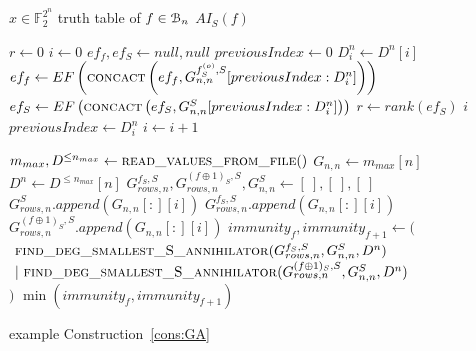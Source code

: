 \documentclass[11pt]{llncs}
\begin{document}
\begin{algorithm}
	\caption{Algorithm to find the algebraic immunity of a function $f$ on the restricted set $S\subseteq \mathbb{F}_2^n$}
	\begin{algorithmic}[1]
		\Require $x\in \mathbb{F}_2^{2^n}$ truth table of $f\in \mathcal{B}_{n}$
		\Ensure $AI_S(f)$
		
		\State $r \gets 0$
		\State $i \gets 0$
		\State $ef_f, ef_S \gets null, null$
		\State $previousIndex \gets 0$
		\State $D_i^n \gets D^n[i]$
		\State $ef_f\gets EF\left(\mbox{\textsc{concact}}\left(ef_f, G_{n,n}^{f_S^{(o)},S}[previousIndex:D_i^n]\right)\right)$
		\State $ef_S \gets EF\left(\mbox{\textsc{concact}}\left(ef_S, G_{n,n}^S[previousIndex:D_i^n]\right)\right)$
		\State $r \gets rank\left(ef_S\right)$
		\State
		\Return $i$
		\EndIf
		\State $previousIndex \gets D_i^n$
		\State $i \gets i+1$
		\EndWhile
		\EndFunction
		\State
		
		\State $m_{max}, D^{\leq n_{max}}\gets \mbox{\textsc{read\_values\_from\_file}}()$
		\State $G_{n,n}\gets m_{max}[n]$
		\State $D^n \gets D^{\leq n_{max}}[n]$
		\State $G_{rows,n}^{f_S,S}, G_{rows,n}^{(f\oplus 1)_S,S}, G_{n,n}^S \gets [\ ], [\ ], [\ ]$
		\State $G_{rows,n}^{S}.append\left(G_{n,n}[:][i]\right)$
		\State $G_{rows,n}^{f_S,S}.append\left(G_{n,n}[:][i]\right)$
		\Else
		\State $G_{rows,n}^{(f\oplus 1)_S,S}.append\left(G_{n,n}[:][i]\right)$
		\EndIf
		\EndIf
		\EndFor
		\State $immunity_f, immunity_{f+1} \leftarrow ($\\
		$\ \mbox{\textsc{find\_deg\_smallest\_S\_annihilator}}(G_{rows,n}^{f_S,S}, G_{n,n}^S,D^{n})$\\
		$\ |\ \mbox{\textsc{find\_deg\_smallest\_S\_annihilator}}(G_{rows,n}^{(f\oplus 1)_S,S}, G_{n,n}^S, D^{n})$\\
		$)$
		\State {}
		\State \Return $\min(immunity_f, immunity_{f+1})$
	\end{algorithmic}
\end{algorithm}
example Construction~\ref{cons:GA}
\end{document}
